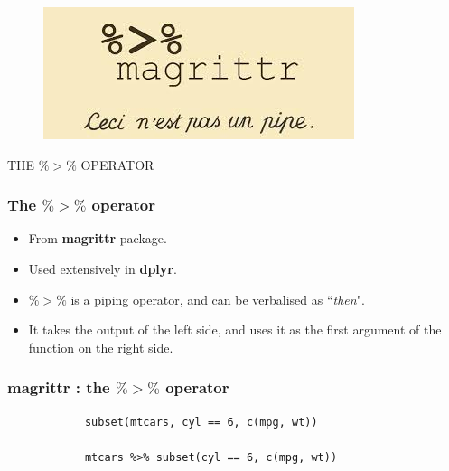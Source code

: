 \documentclass{beamer}
\begin{document}
%			
%	
%		
%	
	\begin{frame}
		\begin{figure}
			\centering
			\includegraphics[width=0.99\linewidth]{images/pipe2}
			
		\end{figure}
			\begin{center}
				{\huge THE $ \%>\% $ OPERATOR}
			\end{center}
			
			
	\end{frame}
	\begin{frame}[fragile]
		\frametitle{ The $\%>\%$ operator}
		\LARGE
		\begin{itemize}
			\item From \textbf{magrittr} package. 
			\item Used extensively in \textbf{dplyr}.
			\item $\%>\%$ is a piping operator, and can be verbalised as ``\textit{then}".
			\item It takes the output of the left side, and uses it as the first
			argument of the function on the right side.
		\end{itemize}
	\end{frame}
	\begin{frame}[fragile]
		\frametitle{magrittr :  the $\%>\%$ operator}
		\Large
		\begin{framed}
			\begin{verbatim}
			subset(mtcars, cyl == 6, c(mpg, wt))
			
			mtcars %>% subset(cyl == 6, c(mpg, wt))
			\end{verbatim}
		\end{framed}
		
	\end{frame}
	
\end{document}
